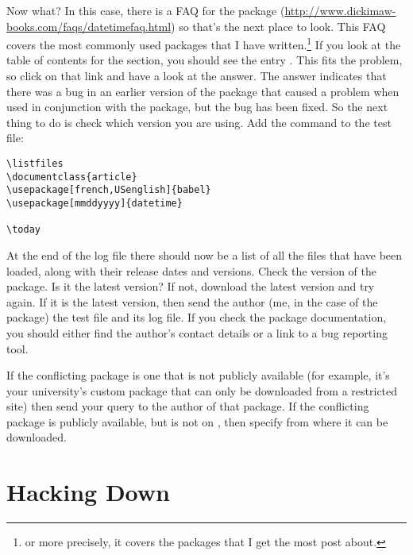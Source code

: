Now what?  In this case, there is a FAQ for the  package
(\url{http://www.dickimaw-books.com/faqs/datetimefaq.html}) so that's the next
place to look. This FAQ covers the most commonly used packages that
I have written.\footnote{or more precisely, it covers the packages
that I get the most post about.} If you look at the table of contents for the
 section, you should see the entry . This fits the problem, so click on
that link and have a look at the answer. The answer indicates that
there was a bug in an earlier version of the  package that
caused a problem when used in conjunction with the  package,
but the bug has been fixed. So the next thing to do is check which
version you are using. Add the command  to the test file: 
\begin{verbatim}
\listfiles
\documentclass{article}
\usepackage[french,USenglish]{babel}
\usepackage[mmddyyyy]{datetime}

\today

\end{verbatim}
At the end of the log file there should now be a list of all the
files that have been loaded, along with their release dates and
versions. Check the version of the  package. Is it the
latest version? If not, download the latest version and try again.
If it is the latest version, then send the author (me, in the case
of the  package) the test file and its log file.
If you check the package documentation, you should either find the
author's contact details or a link to a bug reporting tool.

If the conflicting package is one that is not publicly available
(for example, it's your university's custom package that can only be
downloaded from a restricted site) then send your query to the
author of that package. If the conflicting package is publicly
available, but is not on , 
then specify from where it can be downloaded. 

\section{Hacking Down}
\label{sec:hackingdown}

